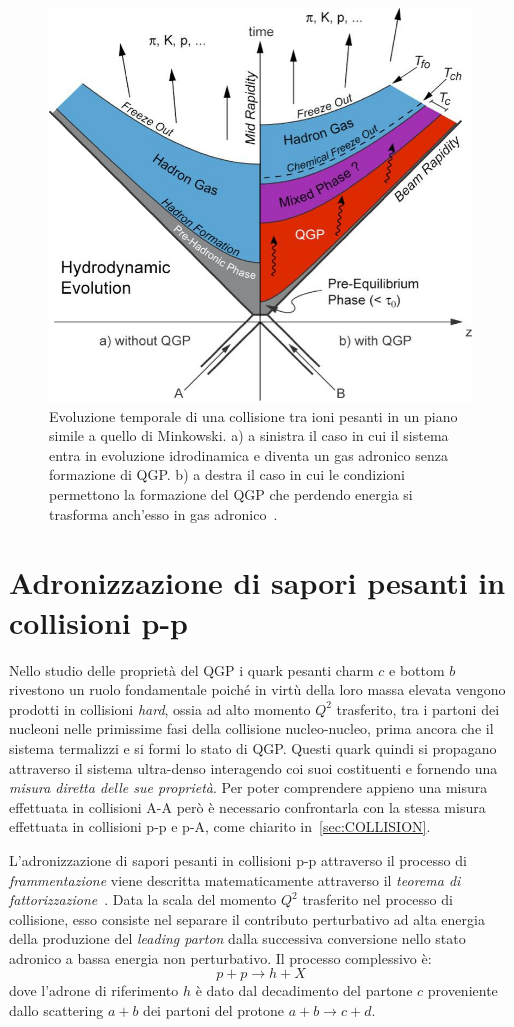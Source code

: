     \begin{figure}[h]
        \centering
        \includegraphics[width=0.65\linewidth]{res/fig/1-chapter/5-TimeEvolQGP.jpg}
        \caption{Evoluzione temporale di una collisione tra ioni pesanti in un piano simile a quello di Minkowski. a) a sinistra il caso in cui il sistema entra in evoluzione idrodinamica e diventa un gas adronico senza formazione di QGP. b) a destra il caso in cui le condizioni permettono la formazione del QGP che perdendo energia si trasforma anch'esso in gas adronico~\cite{ES_2011}.}
        \label{fig:5-time-evol-qgp}
    \end{figure}

\section{Adronizzazione di sapori pesanti in collisioni p-p}
    Nello studio delle proprietà del QGP i quark pesanti charm $c$ e bottom $b$ rivestono un ruolo fondamentale poiché in virtù della loro massa elevata vengono prodotti in collisioni \textit{hard}, ossia ad alto momento $Q^2$ trasferito, tra i partoni dei nucleoni nelle primissime fasi della collisione nucleo-nucleo, prima ancora che il sistema termalizzi e si formi lo stato di QGP. Questi quark quindi si propagano attraverso il sistema ultra-denso interagendo coi suoi costituenti e fornendo una \textit{misura diretta delle sue proprietà}. Per poter comprendere appieno una misura effettuata in collisioni A-A però è necessario confrontarla con la stessa misura effettuata in collisioni p-p e p-A, come chiarito in~\ref{sec:COLLISION}.

    L'adronizzazione di sapori pesanti in collisioni p-p attraverso il processo di \textit{frammentazione} viene descritta matematicamente attraverso il \textit{teorema di fattorizzazione}~\cite{CSS_2004}. Data la scala del momento $Q^2$ trasferito nel processo di collisione, esso consiste nel separare il contributo perturbativo ad alta energia della produzione del \textit{leading parton} dalla successiva conversione nello stato adronico a bassa energia non perturbativo. Il processo complessivo è:
    \begin{equation*}
        p + p \to h + X
    \end{equation*}
    dove l'adrone di riferimento $h$ è dato dal decadimento del partone $c$ proveniente dallo scattering $a + b$ dei partoni del protone $a + b \to c + d$.

